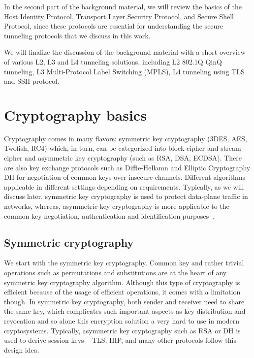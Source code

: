 In the second part of the background material, we will review the basics of the Host 
Identity Protocol, Transport Layer Security Protocol, and Secure Shell Protocol, since 
these protocols are essential for understanding the secure tunneling protocols that we
discuss in this work.

We will finalize the discussion of the background material with a short overview of 
various L2, L3 and L4 tunneling solutions, including L2 802.1Q QinQ tunneling, 
L3 Multi-Protocol Label Switching (MPLS), L4 tunneling using TLS and SSH protocol.

\section{Cryptography basics}

Cryptography comes in many flavors: symmetric key cryptography 
(3DES, AES, Twofish, RC4) which, in turn, can be categorized into 
block cipher and stream cipher and asymmetric key cryptography 
(such as RSA, DSA, ECDSA). There are also key exchange protocols 
such as Diffie-Hellamn and Elliptic Cryptography DH for negotiation 
of common keys over insecure channels. Different algorithms applicable 
in different settings depending on requirements. Typically, as we will 
discuss later, symmetric key cryptography is used to protect 
data-plane traffic in networks, whereas, asymmetric-key cryptography is 
more applicable to the common key negotiation, authentication and 
identification purposes~\cite{Stinson:Cryptography}.

\subsection{Symmetric cryptography}

We start with the symmetric key cryptography. Common key and rather 
trivial operations such as permutations and substitutions are at the 
heart of any symmetric key cryptography algorithm. Although this type 
of cryptography is efficient because of the usage of efficient operations, 
it comes with a limitation though. In symmetric key cryptography, 
both sender and receiver need to share the same key, which complicates 
such important aspects as key distribution and revocation and so alone 
this encryption solution a very hard to use in modern cryptosystems. 
Typically, asymmetric key cryptography such as RSA or DH is used to derive session 
keys – TLS, HIP, and many other protocols follow this design idea.

